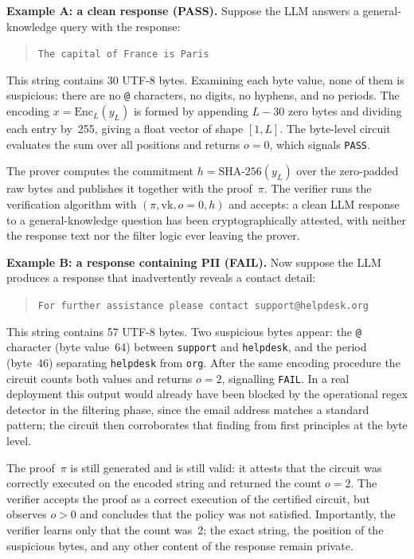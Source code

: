 \medskip

\textbf{Example A: a clean response (PASS).}
Suppose the LLM answers a general-knowledge query with the response:

\begin{quote}
\texttt{The capital of France is Paris}
\end{quote}

This string contains 30 UTF-8 bytes.  Examining each byte value, none of them is suspicious: there are no \texttt{@} characters, no digits, no hyphens, and no periods.  The encoding $x = \mathrm{Enc}_L(y_L)$ is formed by appending $L - 30$ zero bytes and dividing each entry by~255, giving a float vector of shape $[1, L]$.  The byte-level circuit evaluates the sum over all positions and returns $o = 0$, which signals \texttt{PASS}.

The prover computes the commitment $h = \text{SHA-256}(y_L)$ over the zero-padded raw bytes and publishes it together with the proof~$\pi$.  The verifier runs the verification algorithm with $(\pi, \mathrm{vk}, o = 0, h)$ and accepts: a clean LLM response to a general-knowledge question has been cryptographically attested, with neither the response text nor the filter logic ever leaving the prover.

\medskip

\textbf{Example B: a response containing PII (FAIL).}
Now suppose the LLM produces a response that inadvertently reveals a contact detail:

\begin{quote}
\texttt{For further assistance please contact support@helpdesk.org}
\end{quote}

This string contains 57 UTF-8 bytes.  Two suspicious bytes appear: the \texttt{@} character (byte value~64) between \texttt{support} and \texttt{helpdesk}, and the period (byte~46) separating \texttt{helpdesk} from \texttt{org}.  After the same encoding procedure the circuit counts both values and returns $o = 2$, signalling \texttt{FAIL}.  In a real deployment this output would already have been blocked by the operational regex detector in the filtering phase, since the email address matches a standard pattern; the circuit then corroborates that finding from first principles at the byte level.

The proof~$\pi$ is still generated and is still valid: it attests that the circuit was correctly executed on the encoded string and returned the count $o = 2$.  The verifier accepts the proof as a correct execution of the certified circuit, but observes $o > 0$ and concludes that the policy was not satisfied.  Importantly, the verifier learns only that the count was~2; the exact string, the position of the suspicious bytes, and any other content of the response remain private.

